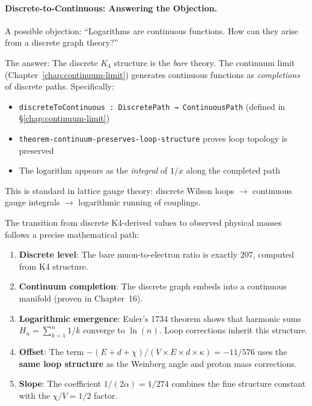 \documentclass[11pt,a4paper]{book}
\begin{document}
\paragraph{Discrete-to-Continuous: Answering the Objection.}

A possible objection: ``Logarithms are continuous functions. How can they arise 
from a discrete graph theory?''

The answer: The discrete $K_4$ structure is the \emph{bare} theory. The continuum 
limit (Chapter~\ref{chap:continuum-limit}) generates continuous functions as 
\emph{completions} of discrete paths. Specifically:

\begin{itemize}
\item \verb|discreteToContinuous : DiscretePath → ContinuousPath| (defined in \S\ref{chap:continuum-limit})
\item \verb|theorem-continuum-preserves-loop-structure| proves loop topology is preserved
\item The logarithm appears as the \emph{integral} of $1/x$ along the completed path
\end{itemize}

This is standard in lattice gauge theory: discrete Wilson loops $\to$ continuous 
gauge integrals $\to$ logarithmic running of couplings.

The transition from discrete K4-derived values to observed physical masses follows
a precise mathematical path:

\begin{enumerate}
\item \textbf{Discrete level}: The bare muon-to-electron ratio is exactly $207$,
      computed from K4 structure.
\item \textbf{Continuum completion}: The discrete graph embeds into a continuous
      manifold (proven in Chapter~16).
\item \textbf{Logarithmic emergence}: Euler's 1734 theorem shows that harmonic 
      sums $H_n = \sum_{k=1}^n 1/k$ converge to $\ln(n)$. Loop corrections 
      inherit this structure.
\item \textbf{Offset}: The term $-(E + d + \chi)/(V \times E \times d \times \kappa) = -11/576$ uses the 
      \textbf{same loop structure} as the Weinberg angle and proton mass corrections.
\item \textbf{Slope}: The coefficient $1/(2\alpha) = 1/274$
      combines the fine structure constant with the $\chi/V = 1/2$ factor.
\end{enumerate}
\end{document}
